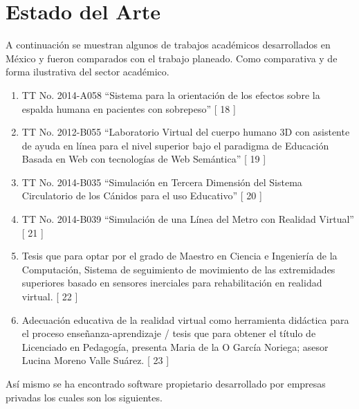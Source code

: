 \documentclass[11pt]{report}
\begin{document}
\section{Estado del Arte}
A continuación se muestran algunos de trabajos académicos desarrollados en México y fueron comparados con el trabajo planeado. Como comparativa y de forma ilustrativa del sector académico.
\\
\newline
\begin{enumerate}
\item TT No. 2014-A058 “Sistema para la orientación de los efectos sobre la espalda humana en pacientes con sobrepeso” [ 18 ]
\item TT No. 2012-B055 “Laboratorio Virtual del cuerpo humano 3D con asistente de ayuda en línea para el nivel superior bajo el paradigma de Educación Basada en Web con tecnologías de Web Semántica” [ 19 ]
\item TT No. 2014-B035 “Simulación en Tercera Dimensión del Sistema Circulatorio de los Cánidos para el uso Educativo” [ 20 ]
\item TT No. 2014-B039 “Simulación de una Línea del Metro con Realidad Virtual” [ 21 ]
\item Tesis que para optar por el grado de Maestro en Ciencia e Ingeniería de la Computación, Sistema de seguimiento de movimiento de las extremidades superiores basado en sensores inerciales para rehabilitación en realidad virtual. [ 22 ]
\item Adecuación educativa de la realidad virtual como herramienta didáctica para el proceso enseñanza-aprendizaje / tesis que para obtener el título de Licenciado en Pedagogía, presenta Maria de la O García Noriega; asesor Lucina Moreno Valle Suárez.  [ 23 ]
\end{enumerate}
Así mismo se ha encontrado software propietario desarrollado por empresas privadas los cuales son los siguientes.\\
\end{document}
